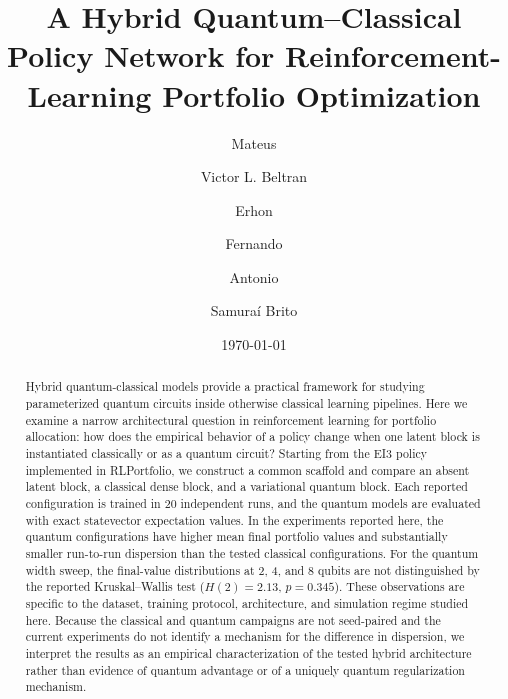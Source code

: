 \documentclass[aps,floatfix,superscriptaddress,twocolumn,tightenlines,amsmath,amssymb,nofootinbib,10pt,longbibliography,prl]{revtex4-2}
\begin{document}
\title{A Hybrid Quantum--Classical Policy Network for Reinforcement-Learning Portfolio Optimization}


\author{Mateus}

\author{Victor L. Beltran}


\author{Erhon}

\author{Fernando}

\author{Antonio }

\author{Samuraí Brito}





\date{\today}
\begin{abstract}
Hybrid quantum-classical models provide a practical framework for studying parameterized quantum circuits inside otherwise classical learning pipelines. Here we examine a narrow architectural question in reinforcement learning for portfolio allocation: how does the empirical behavior of a policy change when one latent block is instantiated classically or as a quantum circuit? Starting from the EI3 policy implemented in RLPortfolio, we construct a common scaffold and compare an absent latent block, a classical dense block, and a variational quantum block. Each reported configuration is trained in 20 independent runs, and the quantum models are evaluated with exact statevector expectation values. In the experiments reported here, the quantum configurations have higher mean final portfolio values and substantially smaller run-to-run dispersion than the tested classical configurations. For the quantum width sweep, the final-value distributions at 2, 4, and 8 qubits are not distinguished by the reported Kruskal--Wallis test ($H(2)=2.13$, $p=0.345$). These observations are specific to the dataset, training protocol, architecture, and simulation regime studied here. Because the classical and quantum campaigns are not seed-paired and the current experiments do not identify a mechanism for the difference in dispersion, we interpret the results as an empirical characterization of the tested hybrid architecture rather than evidence of quantum advantage or of a uniquely quantum regularization mechanism.
\end{abstract}
\maketitle
\end{document}
